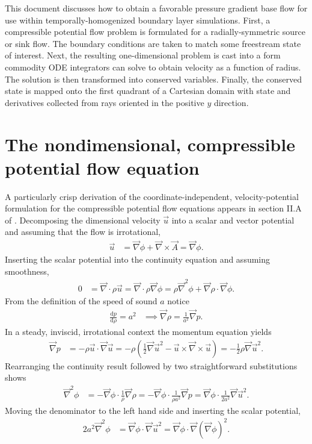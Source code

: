 \documentclass[letterpaper,11pt,nointlimits,reqno]{amsart}
\begin{document}
This document discusses how to obtain a favorable pressure gradient base flow
for use within temporally-homogenized boundary layer simulations.  First, a
compressible potential flow problem is formulated for a radially-symmetric
source or sink flow.  The boundary conditions are taken to match some
freestream state of interest.  Next, the resulting one-dimensional problem is
cast into a form commodity ODE integrators can solve to obtain velocity as a
function of radius.  The solution is then transformed into conserved variables.
Finally, the conserved state is mapped onto the first quadrant of a Cartesian
domain with state and derivatives collected from rays oriented in the positive
$y$ direction.

\section{The nondimensional, compressible potential flow equation}

A particularly crisp derivation of the coordinate-independent,
velocity-potential formulation for the compressible potential flow equations
appears in section II.A of \citet{Saad2011Coordinate}.  Decomposing the
dimensional velocity $\vec{u}$ into a scalar and vector potential and assuming
that the flow is irrotational,
\begin{align}
  \vec{u} &= \vec{\nabla}\phi + \vec{\nabla}\times\vec{A} =  \vec{\nabla}\phi
.
\end{align}
Inserting the scalar potential into the continuity equation and assuming
smoothness,
\begin{align}
  0 &= \vec{\nabla}\cdot\rho\vec{u}
     = \vec{\nabla}\cdot\rho\vec{\nabla}\phi
     = \rho\vec{\nabla}^2\phi
     + \vec{\nabla}\rho\cdot\vec{\nabla}\phi
.
\end{align}
From the definition of the speed of sound $a$ notice
\begin{align}
    \frac{\mathrm{d}p}{\mathrm{d}\rho} = a^2
    &\implies
    \vec{\nabla}\rho = \frac{1}{a^2} \vec{\nabla} p
.
\end{align}
In a steady, inviscid, irrotational context the momentum equation yields
\begin{align}
    \vec{\nabla}p
    &= -\rho \vec{u}\cdot\vec{\nabla}\vec{u}
     = -\rho \left(   \frac{1}{2}\vec{\nabla}\vec{u}^2
                    - \vec{u}\times\vec{\nabla}\times\vec{u}
        \right)
     = - \frac{1}{2} \rho \vec{\nabla}\vec{u}^2
.
\end{align}
Rearranging the continuity result followed by two straightforward substitutions
shows
\begin{align}
    \vec{\nabla}^2\phi
    &= -\vec{\nabla}\phi\cdot\frac{1}{\rho}\vec{\nabla}\rho
     = -\vec{\nabla}\phi\cdot\frac{1}{\rho{}a^2}\vec{\nabla}p
     =  \vec{\nabla}\phi\cdot\frac{1}{2a^2} \vec{\nabla}\vec{u}^2
.
\end{align}
Moving the denominator to the left hand side and inserting the scalar
potential,
\begin{align}
    2 a^2 \vec{\nabla}^2\phi
    &= \vec{\nabla}\phi\cdot \vec{\nabla}\vec{u}^2
     = \vec{\nabla}\phi\cdot \vec{\nabla}\left(\vec{\nabla}\phi\right)^2
\label{eq:cpfgibbs_nothermo_dim}
.
\end{align}
\end{document}
